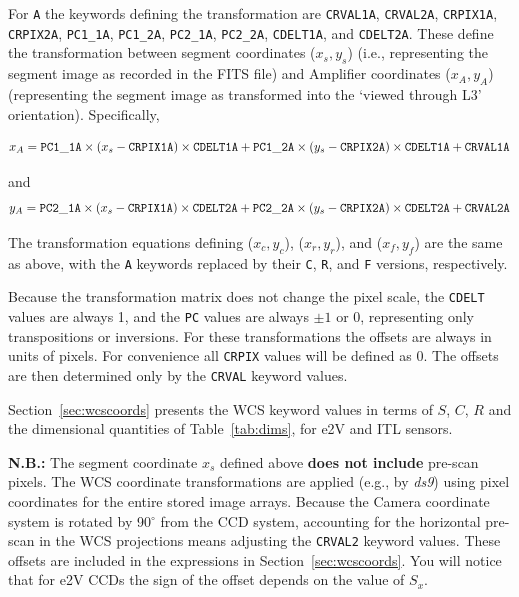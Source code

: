 \documentclass{article}[12pt]
\begin{document}
For {\tt A} the keywords defining the transformation are {\tt CRVAL1A}, {\tt CRVAL2A}, {\tt CRPIX1A}, {\tt CRPIX2A}, {\tt PC1\_1A}, {\tt PC1\_2A}, {\tt PC2\_1A}, {\tt PC2\_2A}, {\tt CDELT1A}, and {\tt CDELT2A}.  These define the transformation between segment coordinates ($x_s, y_s$) (i.e., representing the segment image as recorded in the FITS file) and Amplifier coordinates ($x_A, y_A$) (representing the segment image as transformed into the `viewed through L3' orientation).  Specifically,

\begin{equation}
x_A = {\tt PC1\_1A} \times (x_s -{\tt CRPIX1A}) \times {\tt CDELT1A} + {\tt PC1\_2A} \times (y_s - {\tt CRPIX2A}) \times {\tt CDELT1A} + {\tt CRVAL1A}
\end{equation}

and
\begin{equation}
y_A = {\tt PC2\_1A} \times (x_s - {\tt CRPIX1A}) \times {\tt CDELT2A} + {\tt PC2\_2A} \times (y_s - {\tt CRPIX2A}) \times {\tt CDELT2A} + {\tt CRVAL2A}
\end{equation}

The transformation equations defining ($x_c, y_c$), ($x_r, y_r$), and ($x_f, y_f$) are the same as above, with the {\tt A} keywords replaced by their {\tt C}, {\tt R}, and {\tt F} versions, respectively.

Because the transformation matrix does not change the pixel scale, the {\tt CDELT} values are always 1, and the {\tt PC} values are always $\pm1$ or 0, representing only transpositions or inversions.  For these transformations the offsets are always in units of pixels.  For convenience all {\tt CRPIX} values will be defined as 0.  The offsets are then determined only by the {\tt CRVAL} keyword values.

Section~\ref{sec:wcscoords} presents the WCS keyword values in terms of $S$, $C$, $R$ and the dimensional quantities of Table~\ref{tab:dims}, for e2V and ITL sensors.  

{\bf N.B.:} The segment coordinate $x_s$ defined above {\bf does not include} pre-scan pixels.  The WCS coordinate transformations are applied (e.g., by {\it ds9}) using pixel coordinates for the entire stored image arrays.  Because the Camera coordinate system is rotated by 90$^\circ$ from the CCD system, accounting for the horizontal pre-scan in the WCS projections means adjusting the {\tt CRVAL2} keyword values.  These offsets are included in the expressions in Section~\ref{sec:wcscoords}.  You will notice that for e2V CCDs the sign of the offset depends on the value of $S_x$.
\end{document}
